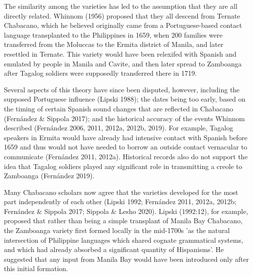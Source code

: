 \begin{styleStandard}
The similarity among the varieties has led to the assumption that they are all directly related. Whinnom (1956) proposed that they all descend from Ternate Chabacano, which he believed originally came from a Portuguese-based contact language transplanted to the Philippines in 1659, when 200 families were transferred from the Moluccas to the Ermita district of Manila, and later resettled in Ternate. This variety would have been relexifed with Spanish and emulated by people in Manila and Cavite, and then later spread to Zamboanga after Tagalog soldiers were supposedly transferred there in 1719. 
\end{styleStandard}

\begin{styleStandard}
Several aspects of this theory have since been disputed, however, including the supposed Portuguese influence (Lipski 1988); the dates being too early, based on the timing of certain Spanish sound changes that are reflected in Chabacano (Fernández \& Sippola 2017); and the historical accuracy of the events Whinnom described (Fernández 2006, 2011, 2012a, 2012b, 2019). For example, Tagalog speakers in Ermita would have already had intensive contact with Spanish before 1659 and thus would not have needed to borrow an outside contact vernacular to communicate (Fernández 2011, 2012a). Historical records also do not support the idea that Tagalog soldiers played any significant role in transmitting a creole to Zamboanga (Fernández 2019). 
\end{styleStandard}

\begin{styleStandard}
Many Chabacano scholars now agree that the varieties developed for the most part independently of each other (Lipski 1992; Fernández 2011, 2012a, 2012b; Fernández \& Sippola 2017; Sippola \& Lesho 2020). Lipski (1992:12), for example, proposed that rather than being a simple transplant of Manila Bay Chabacano, the Zamboanga variety first formed locally in the mid-1700s 'as the natural intersection of Philippine languages which shared cognate grammatical systems, and which had already absorbed a significant quantity of Hispanisms'. He suggested that any input from Manila Bay would have been introduced only after this initial formation.
\end{styleStandard}

